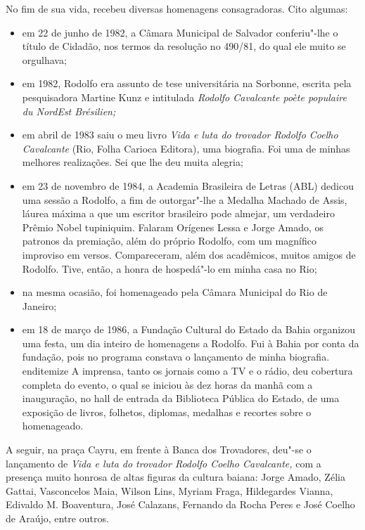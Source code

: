  No fim de sua vida, recebeu diversas homenagens consagradoras. Cito
algumas: 
\begin{itemize}
\item
 em 22 de junho de 1982, a Câmara Municipal de Salvador conferiu"-lhe
o título de Cidadão, nos termos da resolução no 490/81, do qual ele
muito se orgulhava; 

\item
 em 1982, Rodolfo era assunto de tese universitária na Sorbonne,
escrita pela pesquisadora Martine Kunz e intitulada \textit{Rodolfo
Cavalcante poète populaire du NordEst Brésilien;} 

\item
 em abril de 1983 saiu o meu livro \textit{Vida e luta do trovador
Rodolfo Coelho Cavalcante} (Rio, Folha Carioca Editora), uma biografia.
Foi uma de minhas melhores realizações. Sei que lhe deu muita alegria; 

\item
 em 23 de novembro de 1984, a Academia Brasileira de Letras (ABL)
dedicou uma sessão a Rodolfo, a fim de outorgar"-lhe a Medalha Machado
de Assis, láurea máxima a que um escritor brasileiro pode almejar, um
verdadeiro Prêmio Nobel tupiniquim. Falaram Orígenes Lessa e Jorge
Amado, os patronos da premiação, além do próprio Rodolfo, com um
magnífico improviso em versos. Compareceram, além dos acadêmicos,
muitos amigos de Rodolfo. Tive, então, a honra de hospedá"-lo em minha
casa no Rio; 

\item
 na mesma ocasião, foi homenageado pela Câmara Municipal do Rio de
Janeiro; 

\item
 em 18 de março de 1986, a Fundação Cultural do Estado da Bahia
organizou uma festa, um dia inteiro de homenagens a Rodolfo. Fui à
Bahia por conta da fundação, pois no programa constava o lançamento de
minha biografia. 
end{itemize}
 A imprensa, tanto os jornais como a TV e o rádio, deu cobertura
completa do evento, o qual se iniciou às dez horas da manhã com a
inauguração, no hall de entrada da Biblioteca Pública do Estado, de uma
exposição de livros, folhetos, diplomas, medalhas e recortes sobre o
homenageado. 
\end{itemize}

 A seguir, na praça Cayru, em frente à Banca dos Trovadores, deu"-se o
lançamento de \textit{Vida e luta do trovador Rodolfo Coelho
Cavalcante,} com a presença muito honrosa de altas figuras da cultura
baiana: Jorge Amado, Zélia Gattai, Vasconcelos Maia, Wilson Lins,
Myriam Fraga, Hildegardes Vianna, Edivaldo M. Boaventura, José
Calazans, Fernando da Rocha Peres e José Coelho de Araújo, entre
outros. 

